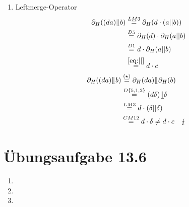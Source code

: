 \documentclass[a4paper]{scrartcl}
\begin{document}
\begin{enumerate}
    \item Leftmerge-Operator
        \begin{align}
            \begin{split}
                \partial_H ((da) \llfloor b ) &\stackrel{LM3}{=} \partial_H (d \cdot (a||b)) \\
                &\stackrel{D5}{=} \partial_H (d) \cdot \partial_H (a||b) \\
                &\stackrel{D1}{=} d \cdot \partial_H (a||b) \\
                &\stackrel{\eqref{eq:||}}{=} d \cdot c
            \end{split} \\
            \begin{split}
                \partial_H ((da) \llfloor b ) &\stackrel{(\star)}{=} \partial_H (da) \llfloor \partial_H (b) \\
                &\stackrel{D\{5,1,2\}}{=} (d\delta) \llfloor \delta \\
                &\stackrel{LM3}{=} d \cdot (\delta || \delta) \\
                &\stackrel{CM12}{=} d \cdot \delta \neq d \cdot c \quad \lightning
            \end{split}
        \end{align}

\end{enumerate}

\section*{Übungsaufgabe 13.6} 

\begin{enumerate}
    \item

    \item

    \item

\end{enumerate}
\end{document}
